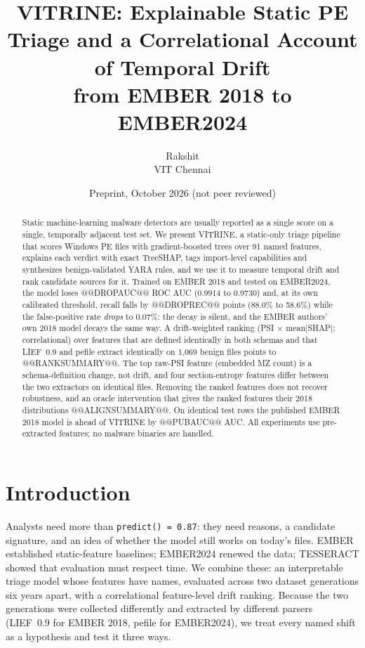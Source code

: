 \documentclass[10pt]{article}
\title{VITRINE: Explainable Static PE Triage and a Correlational Account of Temporal Drift\\from EMBER 2018 to EMBER2024}
\author{Rakshit\\VIT Chennai}
\date{Preprint, October 2026 (not peer reviewed)}
\begin{document}
\maketitle

\begin{abstract}
Static machine-learning malware detectors are usually reported as a single score on a single,
temporally adjacent test set. We present VITRINE, a static-only triage pipeline that scores Windows PE
files with gradient-boosted trees over 91 named features, explains each verdict with exact TreeSHAP,
tags import-level capabilities and synthesizes benign-validated YARA rules, and we use it to measure
temporal drift and rank candidate sources for it. Trained on EMBER 2018 and tested on EMBER2024, the model
loses @@DROPAUC@@ ROC AUC (0.9914 to 0.9730) and, at its own calibrated threshold, recall falls by
@@DROPREC@@ points (88.0\% to 58.6\%) while the false-positive rate \emph{drops} to 0.07\%: the decay is
silent, and the EMBER authors' own 2018 model decays the same way. A drift-weighted ranking
(PSI $\times$ mean$|$SHAP$|$; correlational) over features that are defined identically in both
schemas and that LIEF~0.9 and pefile extract identically on 1{,}069 benign files points to
@@RANKSUMMARY@@. The top raw-PSI feature (embedded MZ count) is a schema-definition change, not drift,
and four section-entropy features differ between the two extractors on identical files. Removing the
ranked features does not recover robustness, and an oracle intervention that gives the ranked features
their 2018 distributions @@ALIGNSUMMARY@@. On identical test rows the published EMBER 2018
model is ahead of VITRINE by @@PUBAUC@@ AUC. All experiments use pre-extracted features; no malware
binaries are handled.
\end{abstract}

\section{Introduction}
Analysts need more than \texttt{predict() = 0.87}: they need reasons, a candidate signature, and an
idea of whether the model still works on today's files. EMBER \citep{anderson2018ember} established
static-feature baselines; EMBER2024 \citep{joyce2025ember2024} renewed the data; TESSERACT
\citep{pendlebury2019tesseract} showed that evaluation must respect time. We combine these: an
interpretable triage model whose features have names, evaluated across two dataset generations six
years apart, with a correlational feature-level drift ranking. Because the two generations were
collected differently and extracted by different parsers (LIEF~0.9 for EMBER 2018, pefile for
EMBER2024), we treat every named shift as a hypothesis and test it three ways.
\end{document}
